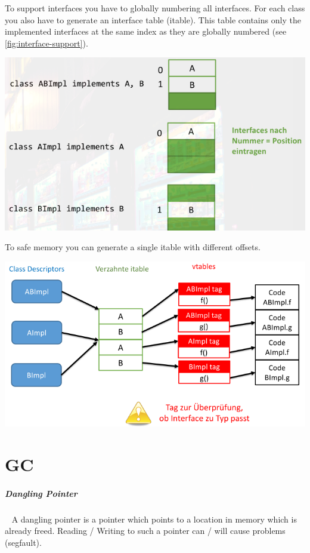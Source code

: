 \documentclass[11pt,twoside,landscape]{article}
\begin{document}
\begin{multicols}{3}
To support interfaces you have to globally numbering all interfaces.
For each class you also have to generate an interface table (itable).
This table contains only the implemented interfaces at the same index as they are globally numbered (see \autoref{fig:interface-support}).

{
\begin{center}
\includegraphics[width=.9\linewidth]{img/interface_support_2.png}
\end{center}
\label{fig:interface-support}
}

To safe memory you can generate a single itable with different offsets.

{
\begin{center}
\includegraphics[width=.9\linewidth]{img/total_interface_support.png}
\end{center}
\label{fig:total-interface-support}
}

\section{GC}
\label{sec:org3da8b86}
\subparagraph{Dangling Pointer} \
\label{sec:org011086e}
A dangling pointer is a pointer which points to a location in memory which is already freed.
Reading / Writing to such a pointer can / will cause problems (segfault).


\end{multicols}
\end{document}
